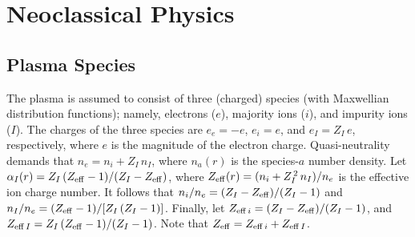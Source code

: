 \documentclass[notitlepage,12pt]{article}
\begin{document}
\section{Neoclassical Physics}\label{appb}
\subsection{Plasma Species}\label{a3}
The plasma is assumed to consist of three (charged) species (with Maxwellian distribution functions); namely,  electrons ($e$), majority ions ($i$), and impurity ions
($I$).  The charges of the  three species are $e_e=-e$, $e_i= e$, and $e_I=Z_I\,e$, respectively, where
$e$ is the magnitude of the electron charge. 
Quasi-neutrality demands that
$n_e= n_i+ Z_I\,n_I$, where $n_a(r)$ is the species-$a$ number density. 
 Let 
$\alpha_I(r) =Z_I\,(Z_{\rm eff}-1)/(Z_I-Z_{\rm eff})$,
where 
$Z_{\rm eff}(r) = (n_i+Z_I^{\,2}\,n_I)/n_e$
is the effective ion charge number. It follows that
$n_i/n_e = (Z_I-Z_{\rm eff})/(Z_I-1)$
and
$n_I/n_e= (Z_{\rm eff}-1)/[Z_I\,(Z_I-1)]$. Finally, let $Z_{{\rm eff}\,i}= (Z_I-Z_{\rm eff})/(Z_I-1)$, and
$Z_{{\rm eff}\,I}=Z_I\,(Z_{\rm eff}-1)/(Z_I-1)$. Note that $Z_{\rm eff}= Z_{{\rm eff}\,i}+ Z_{{\rm eff}\,I}$. 
\end{document}
